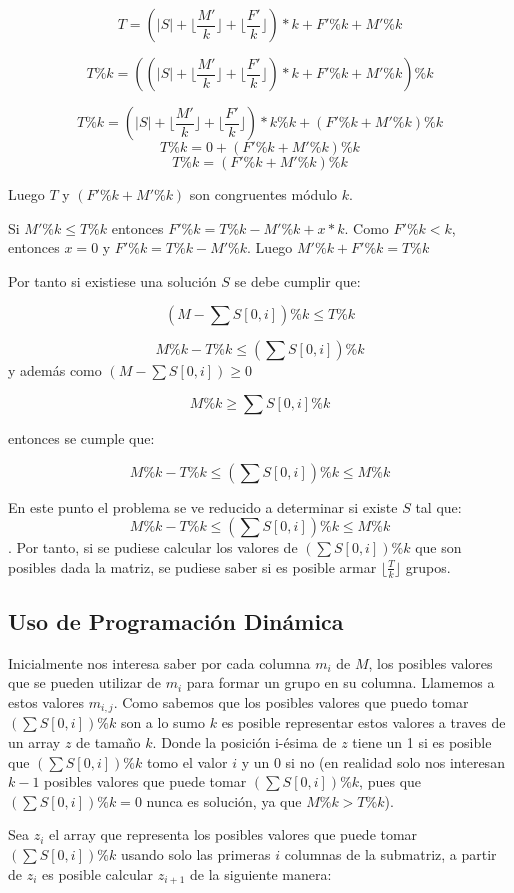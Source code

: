 \documentclass[article]{llncs}
\begin{document}
$$T = (|S| + \lfloor\frac{M'}{k}\rfloor + \lfloor\frac{F'}{k}\rfloor)*k + F'\%k + M'\% k$$

$$T\%k = ((|S| + \lfloor\frac{M'}{k}\rfloor + \lfloor\frac{F'}{k}\rfloor)*k + F'\%k + M'\% k)\%k$$

$$T\%k = (|S| + \lfloor\frac{M'}{k}\rfloor + \lfloor\frac{F'}{k}\rfloor)*k\%k + (F'\%k + M'\% k)\%k$$
$$T\%k = 0 + (F'\%k + M'\% k)\%k$$
$$T\%k = (F'\%k + M'\% k)\%k$$

Luego $T$ y $(F'\%k + M'\% k)$ son congruentes m\'odulo $k$.

Si $M' \% k \leq T \% k$ entonces $F' \%k = T\%k - M'\%k + x*k$.
Como $F' \% k < k$, entonces $x = 0$ y $F' \% k = T\%k - M'\%k$. Luego 
$M' \%k + F' \% k  = T \% k$

Por tanto si existiese una solución $S$ se debe cumplir que:

$$(M - \sum S[0, i])\% k \leq T\%k$$

$$M \%k - T\%k \leq (\sum S[0,i])\%k$$ 
y además como $(M - \sum S[0,i]) \geq 0$

$$M\%k \geq \sum S[0, i] \%k$$

entonces se cumple que: 

$$M\%k - T\% k \leq (\sum S[0,i])\%k \leq M \% k$$

En este punto el problema se ve reducido a determinar si existe $S$ tal que: $$M\%k - T\% k \leq (\sum S[0,i])\%k \leq M \% k$$.
Por tanto, si se pudiese calcular los valores de $(\sum S[0,i])\%k$ que son posibles dada la matriz, se pudiese saber si es posible armar $\lfloor\frac{T}{k}\rfloor$
grupos.

\subsection{Uso de Programación Dinámica}

Inicialmente nos interesa saber por cada columna $m_i$ de $M$, los posibles valores que se pueden utilizar de $m_i$ para formar un grupo en su columna. Llamemos a estos valores $m_{i,j}$.
Como sabemos que los posibles valores que puedo tomar $(\sum S[0,i])\%k$ son a lo sumo $k$ es posible representar estos valores a traves de un array $z$ de tamaño $k$. Donde la posición i-ésima de $z$ tiene
un 1 si es posible que $(\sum S[0,i])\%k$ tomo el valor $i$ y un 0 si no (en realidad solo nos interesan $k-1$ posibles valores que puede tomar $(\sum S[0,i])\%k$, pues que $(\sum S[0,i])\%k = 0$ nunca es solución, ya que $M\%k > T\%k$).

Sea $z_i$ el array que representa los posibles valores que puede tomar $(\sum S[0,i])\%k$ usando solo las primeras $i$ columnas de la submatriz,
a partir de $z_i$ es posible calcular $z_{i+1}$ de la siguiente manera:
\end{document}
